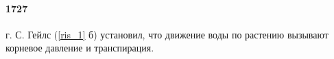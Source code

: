 \paragraph*{1727} г. С. Гейлс (\ris \ref{ris_1} б) установил, что движение воды по растению вызывают корневое давление и транспирация. 


\begin{figure}[h]
\begin{minipage}[h]{0.49\linewidth}
\end{minipage}
\hfill
\begin{minipage}[h]{0.49\linewidth}

\end{minipage}
\end{figure}

